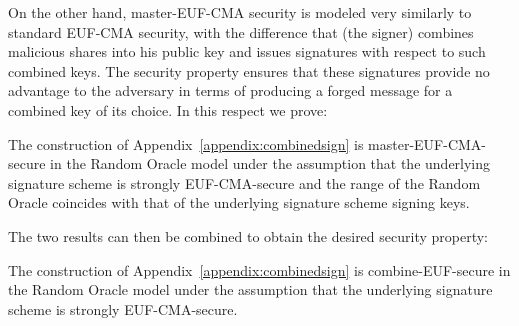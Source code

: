   On the other hand, \textsf{master-EUF-CMA} security is modeled very similarly
  to standard \textsf{EUF-CMA} security, with the difference that \bob{} (the
  signer) combines malicious shares into his public key and issues signatures
  with respect to such combined keys. The security property ensures that these
  signatures provide no advantage to the adversary in terms of producing a
  forged message for a combined key of its choice. In this respect we prove:

  \begin{lemma}
    \label{lemma:comb:master}
    The construction of Appendix~\ref{appendix:combinedsign} is
    \textsf{master-EUF-CMA}-secure in the Random Oracle model under the
    assumption that the underlying signature scheme is strongly
    \textsf{EUF-CMA}-secure and the range of the Random Oracle coincides with
    that of the underlying signature scheme signing keys.
  \end{lemma}

  The two results can then be combined to obtain the desired security property:

  \begin{theorem}
    \label{thm:combsign}
    The construction of Appendix~\ref{appendix:combinedsign} is
    \textsf{combine-EUF}-secure in the Random Oracle model under the assumption
    that the underlying signature scheme is strongly \textsf{EUF-CMA}-secure.
  \end{theorem}
